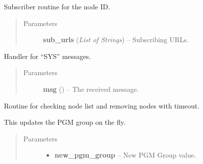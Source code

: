 \documentclass[letterpaper,10pt,english]{sphinxmanual}
\begin{document}
\begin{fulllineitems}
\begin{fulllineitems}
\end{fulllineitems}


\begin{fulllineitems}
\label{swnp:swnp.SWNP.sub_routine_sys}
Subscriber routine for the node ID.
\begin{quote}\begin{description}
\item[{Parameters}] \leavevmode
\textbf{sub\_urls} (\emph{List of Strings}) -- Subscribing URLs.

\end{description}\end{quote}

\end{fulllineitems}


\begin{fulllineitems}
\label{swnp:swnp.SWNP.sys_handler}
Handler for ``SYS'' messages.
\begin{quote}\begin{description}
\item[{Parameters}] \leavevmode
\textbf{msg} ({\hyperref[swnp:swnp.Message]{}}) -- The received message.

\end{description}\end{quote}

\end{fulllineitems}


\begin{fulllineitems}
\label{swnp:swnp.SWNP.timeout_routine}
Routine for checking node list and removing nodes with timeout.

\end{fulllineitems}


\begin{fulllineitems}
\label{swnp:swnp.SWNP.update_pgm_group}
This updates the PGM group on the fly.
\begin{quote}\begin{description}
\item[{Parameters}] \leavevmode\begin{itemize}
\item {} 
\textbf{new\_pgm\_group} -- New PGM Group value.


\end{itemize}
\end{description}
\end{quote}
\end{fulllineitems}
\end{fulllineitems}
\end{document}
